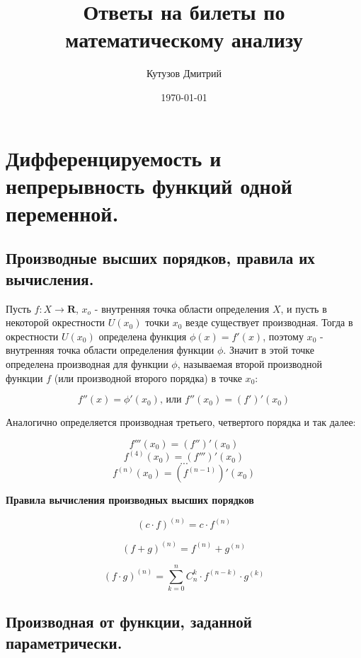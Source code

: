 \documentclass[a4paper,12pt]{article}
\author{Кутузов Дмитрий}
\title{Ответы на билеты по математическому анализу}
\date{\today}
\theoremstyle{plain} %
\theoremstyle{definition} %
\theoremstyle{remark} %
\begin{document}

\maketitle

{
	\hypersetup{linkcolor=black}
	\tableofcontents
	\newpage
}


\section*{Дифференцируемость и непрерывность функций одной переменной.}


\subsection*{Производные высших порядков, правила их вычисления.}

Пусть $f: X \rightarrow \mathbf{R}$, $x_o$ - внутренняя точка области определения $X$, и пусть в некоторой окрестности $U(x_0)$ точки $x_0$ везде существует производная. Тогда в окрестности $U(x_0)$ определена функция $\phi(x) = f'(x)$, поэтому $x_0$ - внутренняя точка области определения функции $\phi$. Значит в этой точке определена производная для функции $\phi$, называемая второй производной функции $f$ (или производной второго порядка) в точке $x_0$:

\[
	f''(x) = \phi'(x_0) \text{, или } f''(x_0) = (f')'(x_0)
\]

Аналогично определяется производная третьего, четвертого порядка и так далее:

\[
	f'''(x_0) = (f'')'(x_0)
\]
\[
	f^{(4)}(x_0) = (f''')'(x_0)
\]
\[
	...
\]
\[
	f^{(n)}(x_0) = (f^{(n-1)})'(x_0)
\]

\textbf{Правила вычисления производных высших порядков}

\[
	(c \cdot f)^{(n)} = c \cdot f^{(n)}
\]

\[
	(f + g)^{(n)} = f^{(n)} + g^{(n)}
\]

\[
	(f \cdot g)^{(n)} = \sum_{k = 0}^{n} C_n^k \cdot f^{(n-k)} \cdot g^{(k)}
\]


\newpage
{}
\subsection*{Производная от функции, заданной параметрически.}
\end{document}
